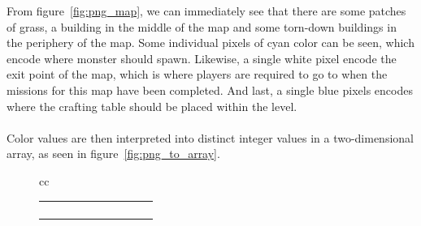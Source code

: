 From figure~\ref{fig:png_map}, we can immediately see that there are some
patches of grass, a building in the middle of the map and some torn-down
buildings in the periphery of the map. Some individual pixels of cyan color can
be seen, which encode where monster should spawn. Likewise, a single white
pixel encode the exit point of the map, which is where players are required to
go to when the missions for this map have been completed. And last, a single
blue pixels encodes where the crafting table should be placed within the level.
\\
\\
Color values are then interpreted into distinct integer values in a
two-dimensional array, as seen in figure~\ref{fig:png_to_array}.
\begin{figure}[H]
    \centering
    \begin{tabular}{cc}
        {\footnotesize
            \setlength{\tabcolsep}{4.5pt}
            \begin{tabular}{|c|c|c|c|c|c|c|c|c|c|}
                \hline
                \cellcolor{black} & \cellcolor{black} & \cellcolor{black} &
                \cellcolor{black} & \cellcolor{black} & \cellcolor{red} &
                \cellcolor{red} & \cellcolor{red} & \cellcolor{red} &
                \cellcolor{red} \\ \hline
                \cellcolor{green} & \cellcolor{green} & \cellcolor{black} &
                \cellcolor{black} & \cellcolor{black} & \cellcolor{yellow} &
                \cellcolor{red} & \cellcolor{red} & \cellcolor{red} &
                \cellcolor{red} \\ \hline
                \cellcolor{green} & \cellcolor{green} & \cellcolor{green} &
                \cellcolor{black} & \cellcolor{black} & \cellcolor{yellow} &
                \cellcolor{red} & \cellcolor{red} & \cellcolor{red} &
                \cellcolor{red} \\ \hline
                \cellcolor{green} & \cellcolor{green} & \cellcolor{green} &
                \cellcolor{black} & \cellcolor{black} & \cellcolor{yellow} &
                \cellcolor{red} & \cellcolor{red} & \cellcolor{red} &
                \cellcolor{red} \\ \hline
                \cellcolor{green} & \cellcolor{green} & \cellcolor{green} &
                \cellcolor{black} & \cellcolor{black} & \cellcolor{yellow} &
                \cellcolor{yellow} & \cellcolor{red} & \cellcolor{red} &
                \cellcolor{yellow} \\ \hline

\end{tabular}}
\end{tabular}
\end{figure}
